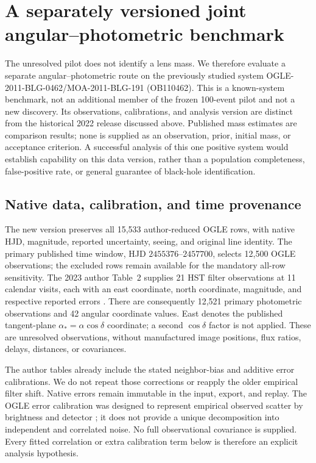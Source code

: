 \section{A separately versioned joint angular--photometric benchmark}
\label{sec:joint-native-benchmark}

The unresolved pilot does not identify a lens mass. We therefore evaluate a
separate angular--photometric route on the previously studied system
OGLE-2011-BLG-0462/MOA-2011-BLG-191 (OB110462). This is a known-system benchmark,
not an additional member of the frozen 100-event pilot and not a new discovery.
Its observations, calibrations, and analysis version are distinct from the
historical 2022 release discussed above. Published mass estimates are comparison
results; none is supplied as an observation, prior, initial mass, or acceptance
criterion. A successful analysis of this one positive system would establish
capability on this data version, rather than a population completeness,
false-positive rate, or general guarantee of black-hole identification.

\subsection{Native data, calibration, and time provenance}

The new version preserves all 15,533 author-reduced OGLE rows, with native HJD,
magnitude, reported uncertainty, seeing, and original line identity. The primary
published time window, HJD $2455376$--$2457700$, selects 12,500 OGLE observations;
the excluded rows remain available for the mandatory all-row sensitivity.
The 2023 author Table~2 supplies 21 HST filter observations at 11 calendar visits,
each with an east coordinate, north coordinate, magnitude, and respective
reported errors \cite{LamLu2023}. There are consequently 12,521 primary
photometric observations and 42 angular coordinate values. East denotes the
published tangent-plane $\alpha_* = \alpha\cos\delta$ coordinate; a second
$\cos\delta$ factor is not applied. These are unresolved observations, without
manufactured image positions, flux ratios, delays, distances, or covariances.

The author tables already include the stated neighbor-bias and additive error
calibrations. We do not repeat those corrections or reapply the older empirical
filter shift. Native errors remain immutable in the input, export, and replay.
The OGLE error calibration was designed to represent empirical observed scatter
by brightness and detector \cite{Mroz2022Noise}; it does not provide a unique
decomposition into independent and correlated noise. No full observational
covariance is supplied. Every fitted correlation or extra calibration term below
is therefore an explicit analysis hypothesis.

